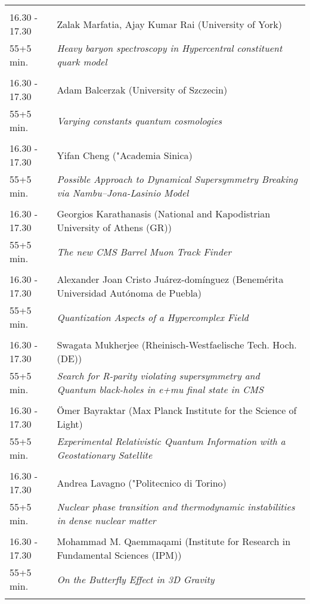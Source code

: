 \begin{longtable}{p{3cm}p{13cm}}
 & \\ 
16.30 - 17.30 & Zalak Marfatia, Ajay Kumar Rai (University of York)\\ 
55+5 min. & {\it Heavy baryon spectroscopy in Hypercentral constituent quark model}\\ 
 & \\ 
16.30 - 17.30 & Adam Balcerzak (University of Szczecin)\\ 
55+5 min. & {\it Varying constants quantum cosmologies}\\ 
 & \\ 
16.30 - 17.30 & Yifan Cheng ("Academia Sinica)\\ 
55+5 min. & {\it Possible Approach to Dynamical Supersymmetry Breaking via Nambu--Jona-Lasinio Model}\\ 
 & \\ 
16.30 - 17.30 & Georgios Karathanasis (National and Kapodistrian University of Athens (GR))\\ 
55+5 min. & {\it The new CMS Barrel Muon Track Finder}\\ 
 & \\ 
16.30 - 17.30 & Alexander Joan Cristo Juárez-domínguez (Benemérita Universidad Autónoma de Puebla)\\ 
55+5 min. & {\it Quantization Aspects of a Hypercomplex Field}\\ 
 & \\ 
16.30 - 17.30 & Swagata Mukherjee (Rheinisch-Westfaelische Tech. Hoch. (DE))\\ 
55+5 min. & {\it Search for R-parity violating supersymmetry and Quantum black-holes in e+mu final state in CMS}\\ 
 & \\ 
16.30 - 17.30 & Ömer Bayraktar (Max Planck Institute for the Science of Light)\\ 
55+5 min. & {\it Experimental Relativistic Quantum Information with a Geostationary Satellite}\\ 
 & \\ 
16.30 - 17.30 & Andrea Lavagno ("Politecnico di Torino)\\ 
55+5 min. & {\it Nuclear phase transition and thermodynamic instabilities in dense nuclear matter}\\ 
 & \\ 
16.30 - 17.30 & Mohammad M. Qaemmaqami (Institute for Research in Fundamental Sciences (IPM))\\ 
55+5 min. & {\it On the Butterfly Effect in 3D Gravity}\\ 
 & \\ 

\end{longtable}
